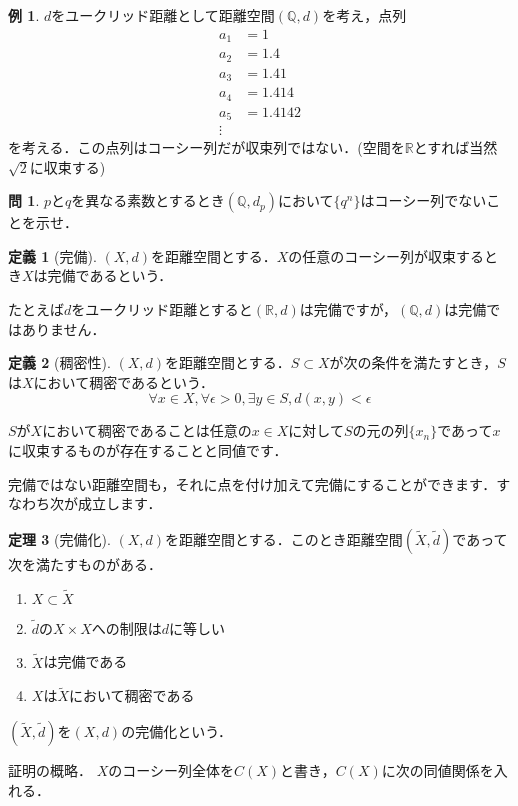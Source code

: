 \documentclass[uplatex]{jsarticle}
\newcommand{\Q}{\mathbb{Q}}
\newcommand{\R}{\mathbb{R}}
\theoremstyle{definition} %
\newtheorem{thm}{定理}
\newtheorem{defi}[thm]{定義}
\newtheorem*{example*}{例}
\newtheorem*{exercise*}{問}
\begin{document}
\begin{example*}
$d$をユークリッド距離として距離空間$(\Q, d)$を考え，点列
\begin{align*}
a_1 &= 1 \\
a_2 &= 1.4 \\
a_3 &= 1.41 \\
a_4 &= 1.414 \\
a_5 &= 1.4142 \\
\vdots
\end{align*}
を考える．この点列はコーシー列だが収束列ではない．(空間を$\R$とすれば当然$\sqrt 2$に収束する)
\end{example*}

\begin{exercise*}
$p$と$q$を異なる素数とするとき$(\Q, d_p)$において$\{q^n\}$はコーシー列でないことを示せ．
\end{exercise*}

\begin{oframed}\begin{defi}[完備]
$(X, d)$を距離空間とする．$X$の任意のコーシー列が収束するとき$X$は完備であるという．
\end{defi}\end{oframed}

たとえば$d$をユークリッド距離とすると$(\R, d)$は完備ですが，$(\Q, d)$は完備ではありません．

\begin{oframed}\begin{defi}[稠密性]
$(X, d)$を距離空間とする．$S \subset X$が次の条件を満たすとき，$S$は$X$において稠密であるという．
\[
\forall x \in X, \forall \epsilon > 0, \exists y \in S, d(x, y) < \epsilon
\]
\end{defi}\end{oframed}

$S$が$X$において稠密であることは任意の$x\in X$に対して$S$の元の列$\{x_n\}$であって$x$に収束するものが存在することと同値です．

完備ではない距離空間も，それに点を付け加えて完備にすることができます．すなわち次が成立します．

\begin{oframed}\begin{thm}[完備化]
$(X, d)$を距離空間とする．このとき距離空間$(\tilde{X}, \tilde{d})$であって次を満たすものがある．
\begin{enumerate}
\item $X \subset \tilde{X}$
\item $\tilde{d}$の$X \times X$への制限は$d$に等しい
\item $\tilde{X}$は完備である
\item $X$は$\tilde{X}$において稠密である
\end{enumerate}
$(\tilde{X}, \tilde{d})$を$(X,d)$の完備化という．
\end{thm}\end{oframed}
\noindent 証明の概略．
$X$のコーシー列全体を$C(X)$と書き，$C(X)$に次の同値関係を入れる．
\end{document}
